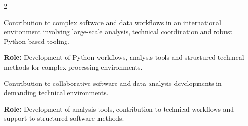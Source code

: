 \documentclass[8pt,a4paper,ragged2e,withhyper]{altacv}
\begin{document}
\begin{paracol}{2}







\end{paracol}

\newpage
{}


Contribution to complex software and data workflows in an international environment involving large-scale analysis, technical coordination and robust Python-based tooling.

\textbf{Role:} Development of Python workflows, analysis tools and structured technical methods for complex processing environments.

\divider


Contribution to collaborative software and data analysis developments in demanding technical environments.

\textbf{Role:} Development of analysis tools, contribution to technical workflows and support to structured software methods.

{\small
{}
}
\\
\divider\smallskip
\vspace{-.3cm}
\end{document}
